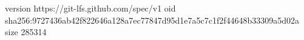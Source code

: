 version https://git-lfs.github.com/spec/v1
oid sha256:9727436ab42f822646a128a7ec77847d95d1e7a5c7c1f2f44648b33309a5d02a
size 285314
